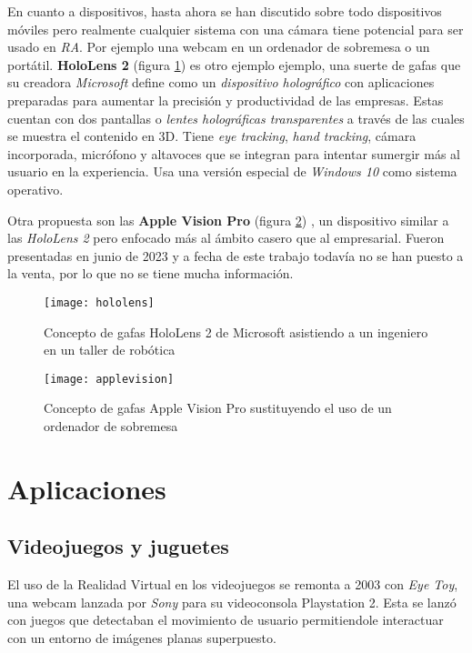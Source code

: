 En cuanto a dispositivos, hasta ahora se han discutido sobre todo dispositivos móviles pero realmente cualquier sistema con una cámara tiene potencial para ser usado en \textit{RA}. Por ejemplo una webcam en un ordenador de sobremesa o un portátil. \textbf{HoloLens 2}\cite{hololens} (figura \ref{fig:hololens}) es otro ejemplo ejemplo, una suerte de gafas que su creadora \textit{Microsoft} define como un \textit{dispositivo holográfico} con aplicaciones preparadas para aumentar la precisión y productividad de las empresas. Estas cuentan con dos pantallas o \textit{lentes holográficas transparentes} a través de las cuales se muestra el contenido en 3D. Tiene \textit{eye tracking}, \textit{hand tracking}, cámara incorporada, micrófono y altavoces que se integran para intentar sumergir más al usuario en la experiencia. Usa una versión especial de \textit{Windows 10} como sistema operativo.

Otra propuesta son las \textbf{Apple Vision Pro} (figura \ref{fig:visionpro}) , un dispositivo similar a las \textit{HoloLens 2} pero enfocado más al ámbito casero que al empresarial. Fueron presentadas en junio de 2023 y a fecha de este trabajo todavía no se han puesto a la venta, por lo que no se tiene mucha información.

\begin{figure}[h]
    \centering
    \texttt{[image: hololens]}
    \caption[HoloLens 2]{Concepto de gafas HoloLens 2 de Microsoft asistiendo a un ingeniero en un taller de robótica}
    \label{fig:hololens}
\end{figure}

\begin{figure}[h]
    \centering
    \texttt{[image: applevision]}
    \caption[Apple Vision Pro]{Concepto de gafas Apple Vision Pro sustituyendo el uso de un ordenador de sobremesa}
    \label{fig:visionpro}
\end{figure}

\section{Aplicaciones}

\subsection*{Videojuegos y juguetes}

El uso de la Realidad Virtual en los videojuegos se remonta a 2003 con \textit{Eye Toy}\cite{eyetoy}, una webcam lanzada por \textit{Sony} para su videoconsola Playstation 2. Esta se lanzó con juegos que detectaban el movimiento de usuario permitiendole interactuar con un entorno de imágenes planas superpuesto.

